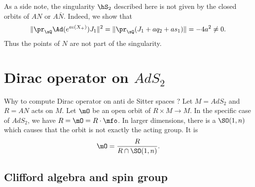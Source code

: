 As a side note, the singularity $\hS_2$ described here is not given by the closed orbits of $AN$ or $A\bar N$. Indeed, we show that
\begin{equation}
	\| \pr_{\sQ}\Ad( e^{a\iota(X_+)})J_1 \|^2=\| \pr_{\sQ}(J_1+aq_2+as_1) \|=-4a^2\neq 0.
\end{equation}
Thus the points of $N$ are not part of the singularity.


\section{Dirac operator on \texorpdfstring{$AdS_2$}{AdS2}}

Why to compute Dirac operator on anti de Sitter spaces ? Let $M=AdS_2$ and $R=AN$ acts on $M$. Let $\mO$ be an open orbit of $R\times M\to M$. In the specific case of $AdS_2$, we have $R=\mO=R\cdot\mfo$. In larger dimensions, there is a $\SO(1,n)$ which causes that the orbit is not exactly the acting group. It is
\[ 
  \mO=\frac{ R }{ R\cap \SO(1,n) }.
\]

\subsection{Clifford algebra and spin group}


